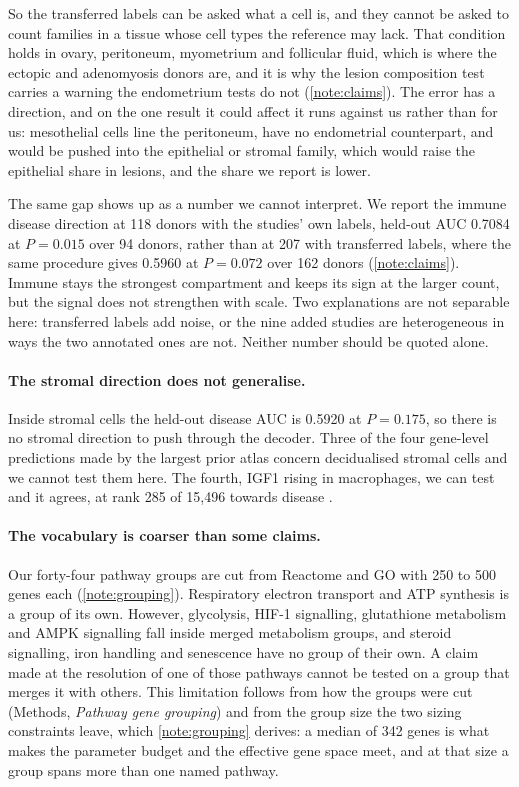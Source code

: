 So the transferred labels can be asked what a cell is, and they cannot be
asked to count families in a tissue whose cell types the reference may
lack. That condition holds in ovary, peritoneum, myometrium and follicular
fluid, which is where the ectopic and adenomyosis donors are, and it is why
the lesion composition test carries a warning the endometrium tests do not
(\ref{note:claims}). The error has a direction, and on the one result it
could affect it runs against us rather than for us: mesothelial cells line
the peritoneum, have no endometrial counterpart, and would be pushed into
the epithelial or stromal family, which would raise the epithelial share in
lesions, and the share we report is lower.

The same gap shows up as a number we cannot interpret. We report the immune
disease direction at 118 donors with the studies' own labels, held-out AUC
0.7084 at $P = 0.015$ over 94 donors, rather than at 207 with transferred
labels, where the same procedure gives 0.5960 at $P = 0.072$ over 162
donors (\ref{note:claims}). Immune stays the strongest compartment and
keeps its sign at the larger count, but the signal does not strengthen with
scale. Two explanations are not separable here: transferred labels add
noise, or the nine added studies are heterogeneous in ways the two
annotated ones are not. Neither number should be quoted alone.

\paragraph{The stromal direction does not generalise.} Inside stromal cells
the held-out disease AUC is 0.5920 at $P = 0.175$, so there is no stromal
direction to push through the decoder. Three of the four gene-level
predictions made by the largest prior atlas concern decidualised stromal
cells and we cannot test them here. The fourth, IGF1 rising in macrophages,
we can test and it agrees, at rank 285 of 15{,}496 towards disease
\citep{mareckova2024heca}.

\paragraph{The vocabulary is coarser than some claims.} Our forty-four
pathway groups are cut from Reactome \citep{gillespie2022reactome} and GO
\citep{go2023knowledgebase} with 250 to 500 genes each
(\ref{note:grouping}). Respiratory electron transport
and ATP synthesis is a group of its own. However, glycolysis, HIF-1
signalling, glutathione metabolism and AMPK signalling fall inside merged
metabolism groups, and steroid signalling, iron handling and senescence
have no group of their own. A claim made at the resolution of one of those
pathways \citep{sarsenova2024metabolic,li2025iron} cannot be tested on a
group that merges it with others. This limitation follows from how the
groups were cut (Methods, \emph{Pathway gene grouping}) and from the group
size the two sizing constraints leave, which
\ref{note:grouping} derives: a median of 342 genes is
what makes the parameter budget and the effective gene space meet, and at
that size a group spans more than one named pathway.

